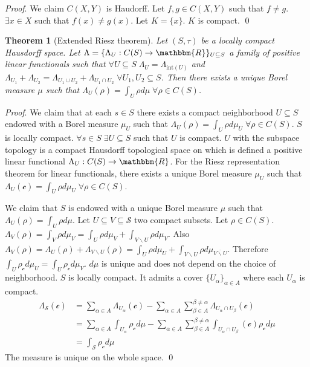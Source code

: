 \documentclass[aps,pra,10pt,twocolumn,floatfix,nofootinbib]{revtex4-1}
\numberwithin{equation}{section}
\newtheorem{thrm}[equation]{Theorem}
\theoremstyle{definition}
\renewenvironment{proof}{\emph{Proof}.}{\qed}
\begin{document}
\begin{proof}
	We claim $C(X, Y)$ is Haudorff. Let $f, g \in C(X, Y)$ such that $f \neq g$. $\exists x \in X$ such that $f(x)\neq g(x)$. Let $K = \{x\}$. $K$ is compact.
\end{proof}

\begin{thrm}[Extended Riesz theorem]\label{extended_riesz_theorem}
	Let $(S, \tau)$ be a locally compact Hausdorff space. Let $\Lambda = \{\Lambda_U : C(S) \rightarrow \mathbbm{R}\}_{U \subseteq S}$ a family of positive linear functionals such that $\forall U \subseteq S \; \Lambda_U = \Lambda_{\mathrm{int}(U)}$ and $\Lambda_{U_1} + \Lambda_{U_2} = \Lambda_{U_1 \cup U_2} + \Lambda_{U_1 \cap U_2} \; \forall U_1, U_2 \subseteq S$. Then there exists a unique Borel measure $\mu$ such that $\Lambda_U (\rho) = \int_{U} \rho d\mu \; \forall \rho \in C(S)$.
\end{thrm}

\begin{proof}
	We claim that at each $s \in S$ there exists a compact neighborhood $U \subseteq S$ endowed with a Borel measure $\mu_U$ such that $\Lambda_U (\rho) = \int_U \rho d \mu_U \; \forall \rho \in C(S)$. $S$ is locally compact. $\forall s \in S \; \exists U \subseteq S$ such that $U$ is compact. $U$ with the subspace topology is a compact Hausdorff topological space on which is defined a positive linear functional $\Lambda_U : C(S) \rightarrow \mathbbm{R}$. For the Riesz representation theorem for linear functionals, there exists a unique Borel measure $\mu_U$ such that $\Lambda_U (\mathcal{c}) = \int_U \rho d \mu_U \; \forall \rho \in C(S)$.
	
	We claim that $S$ is endowed with a unique Borel measure $\mu$ such that $\Lambda_U (\rho) = \int_U \rho d \mu$. Let $U \subseteq V \subseteq \mathcal{S}$ two compact subsets. Let $\rho \in C(S)$. $\Lambda_V (\rho) = \int_V \rho d \mu_V = \int_U \rho d \mu_V + \int_{V\backslash U} \rho d \mu_V$. Also $\Lambda_V (\rho) = \Lambda_U (\rho) + \Lambda_{V\backslash U} (\rho) = \int_U \rho d \mu_U + \int_{V \backslash U} \rho d \mu_{\overline{V \backslash U}} $. Therefore $\int_{U} \rho_{\mathcal{c}} d \mu_U = \int_{U} \rho_{\mathcal{c}} d \mu_V$. $d\mu$ is unique and does not depend on the choice of neighborhood. $S$ is locally compact. It admits a cover $\{U_\alpha\}_{\alpha \in A}$ where each $U_\alpha$ is compact.
	\begin{align*}
	\Lambda_{\mathcal{S}}(\mathcal{c}) &= \sum \limits_{\alpha \in A} \Lambda_{U_\alpha}(\mathcal{c}) - \sum \limits_{\alpha \in A} \sum \limits_{\beta \in A}^{\beta \neq\alpha} \Lambda_{U_\alpha \cap U_\beta}(\mathcal{c}) \\
	&= \sum \limits_{\alpha \in A} \int_{U_\alpha} \rho_{\mathcal{c}} d\mu - \sum \limits_{\alpha \in A} \sum \limits_{\beta \in A}^{\beta \neq\alpha} \int_{U_\alpha \cap U_\beta}(\mathcal{c}) \rho_{\mathcal{c}} d\mu \\
	&= \int_{\mathcal{S}} \rho_{\mathcal{c}} d\mu
	\end{align*}
	The measure is unique on the whole space.
\end{proof}
\end{document}

